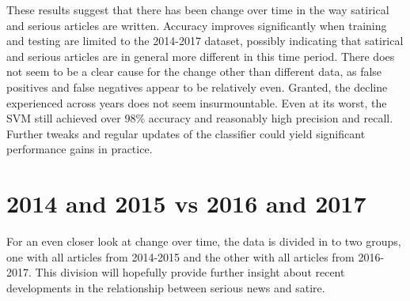 \documentclass [12 pt] {report}
\begin{document}
These results suggest that there has been change over time in the way satirical and serious articles are written. Accuracy improves significantly when training and testing are limited to the 2014-2017 dataset, possibly indicating that satirical and serious articles are in general more different in this time period. There does not seem to be a clear cause for the change other than different data, as false positives and false negatives appear to be relatively even. Granted, the decline experienced across years does not seem insurmountable. Even at its worst, the SVM still achieved over 98\% accuracy and reasonably high precision and recall. Further tweaks and regular updates of the classifier could yield significant performance gains in practice.

\section{2014 and 2015 vs 2016 and 2017}
For an even closer look at change over time, the data is divided in to two groups, one with all articles from 2014-2015 and the other with all articles from 2016-2017. This division will hopefully provide further insight about recent developments in the relationship between serious news and satire.
\end{document}
